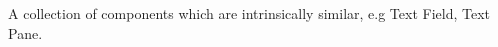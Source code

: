\item[Concrete Component Group]{A collection of 
components which are intrinsically 
similar, e.g Text Field, Text Pane. 
}

